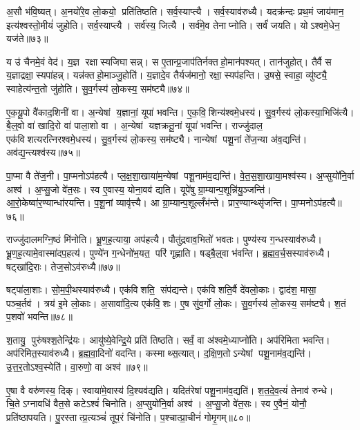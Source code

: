 अ॒सौ भ॑वि॒ष्यत्। अ॒नयो॑रे॒व लो॒कयो॒ प्रति॑तिष्ठति। सर्व॒स्याप्त्यै। सर्व॒स्याव॑रुध्यै। यदक्र॑न्दः प्रथ॒मं जाय॑मान॒ इत्य॑श्वस्तो॒मीयं॑ जुहोति। सर्व॒स्याप्त्यै। सर्व॑स्य॒ जित्यै। सर्व॑मे॒व तेनाप्नोति। सर्वं॑ जयति। योऽश्वमे॒धेन॒ यज॑ते॥७३॥

य उ॑ चैनमे॒वं वेद॑। य॒ज्ञ रक्षास्यजिघासन्न्। स ए॒तान्प्र॒जाप॑तिर्नक्तहो॒मान॑पश्यत्। तान॑जुहोत्। तैर्वै स य॒ज्ञाद्रक्षा॒स्यपा॑हन्न्। यन्न॑क्तहो॒माञ्जु॒होति॑। य॒ज्ञादे॒व तैर्यज॑मानो॒ रक्षा॒स्यप॑हन्ति। उ॒षसे॒ स्वाहा॒ व्यु॑ष्ट्यै॒ स्वाहेत्य॑न्त॒तो जु॑होति। सु॒व॒र्गस्य॑ लो॒कस्य॒ सम॑ष्ट्यै॥७४॥\anuvakamend[वै नभासि॒ सूर्यो॒ ज्योति॒ सन्त॑त्यै॒ सम॑ष्ट्यै भू॒तं यज॑ते॒ नव॑ च]

ए॒क॒यू॒पो वै॑काद॒शिनी॑ वा। अ॒न्येषां य॒ज्ञानां॒ यूपा॑ भवन्ति। ए॒क॒वि॒शिन्य॑श्वमे॒धस्य॑। सु॒व॒र्गस्य॑ लो॒कस्या॒भिजि॑त्यै। बै॒ल्॒वो वा॑ खादि॒रो वा॑ पाला॒शो वा। अ॒न्येषां यज्ञक्रतू॒नां यूपा॑ भवन्ति। राज्जु॑दाल॒ एक॑विशत्यरत्निरश्वमे॒धस्य॑। सु॒व॒र्गस्य॑ लो॒कस्य॒ सम॑ष्ट्यै। नान्येषां पशू॒नां ते॑ज॒न्या अ॑व॒द्यन्ति॑। अव॑द्य॒न्त्यश्व॑स्य॥७५॥

पा॒प्मा वै ते॑ज॒नी। पा॒प्मनोऽप॑हत्यै। प्ल॒क्ष॒शा॒खाया॑म॒न्येषां पशू॒नाम॑व॒द्यन्ति॑। वे॒त॒स॒शा॒खाया॒मश्व॑स्य। अ॒प्सुयो॑नि॒र्वा अश्व॑। अ॒प्सु॒जो वे॑त॒सः। स्व ए॒वास्य॒ योना॒वव॑ द्यति। यूपे॑षु ग्रा॒म्यान्प॒शून्नि॑यु॒ञ्जन्ति॑। आ॒रो॒केष्वा॑र॒ण्यान्धा॑रयन्ति। प॒शू॒नां व्यावृ॑त्त्यै। आ ग्रा॒म्यान्प॒शूल्लँभ॑न्ते। प्रार॒ण्यान्थ्सृ॑जन्ति। पा॒प्मनोऽप॑हत्यै॥७६॥\anuvakamend[अश्व॑स्य॒ व्यावृ॑त्त्यै॒ त्रीणि॑ च]

राज्जु॑दालमग्नि॒ष्ठं मि॑नोति। भ्रू॒ण॒ह॒त्याया॒ अप॑हत्यै। पौतु॑द्रवाव॒भितो॑ भवतः। पुण्य॑स्य ग॒न्धस्याव॑रुध्यै। भ्रू॒ण॒ह॒त्यामे॒वास्मा॑दप॒हत्य॑। पुण्ये॑न ग॒न्धेनो॑भ॒यत॒ परि॑ गृह्णाति। षड्बै॒ल्॒वा भ॑वन्ति। ब्र॒ह्म॒व॒र्च॒सस्याव॑रुध्यै। षट्खा॑दि॒राः। तेज॒सोऽव॑रुध्यै॥७७॥

षट्पा॑ला॒शाः। सो॒म॒पी॒थस्याव॑रुध्यै। एक॑विशति॒ संप॑द्यन्ते। एक॑विशति॒र्वै दे॑वलो॒काः। द्वाद॑श॒ मासा॒ पञ्च॒र्तव॑। त्रय॑ इ॒मे लो॒काः। अ॒सावा॑दि॒त्य एक॑वि॒शः। ए॒ष सु॑व॒र्गो लो॒कः। सु॒व॒र्गस्य॑ लो॒कस्य॒ सम॑ष्ट्यै। श॒तं प॒शवो॑ भवन्ति॥७८॥

श॒तायु॒ पुरु॑षश्श॒तेन्द्रि॑यः। आयु॑ष्ये॒वेन्द्रि॒ये प्रति॑ तिष्ठति। सर्वं॒ वा अ॑श्वमे॒ध्याप्नो॑ति। अप॑रिमिता भवन्ति। अप॑रिमित॒स्याव॑रुध्यै। ब्र॒ह्म॒वा॒दिनो॑ वदन्ति। कस्माथ्स॒त्यात्। द॒क्षि॒ण॒तोऽन्येषां पशू॒नाम॑व॒द्यन्ति॑। उ॒त्त॒र॒तोऽश्व॒स्येति॑। वा॒रुणो॒ वा अश्व॑॥७९॥

ए॒षा वै वरु॑णस्य॒ दिक्। स्वाया॑मे॒वास्य॑ दि॒श्यव॑द्यति। यदित॑रेषां पशू॒नाम॑व॒द्यति॑। श॒त॒दे॒व॒त्यं॑ तेनाव॑ रुन्धे। चि॒तेऽग्नावधि॑ वैत॒से कटेऽश्वं॑ चिनोति। अ॒प्सुयो॑नि॒र्वा अश्व॑। अ॒प्सु॒जो वे॑त॒सः। स्व ए॒वैनं॒ योनौ॒ प्रति॑ष्ठापयति। पु॒रस्तात्प्र॒त्यञ्चं॑ तूप॒रं चि॑नोति। प॒श्चात्प्रा॒चीनं॑ गोमृ॒गम्॥८०॥

